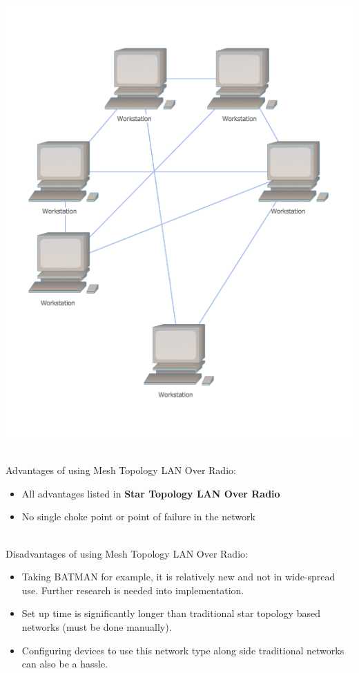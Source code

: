 \documentclass[onecolumn, draftclsnofoot,10pt, compsoc]{IEEEtran}
\begin{document}
		\begin{center}
			\includegraphics[scale=0.5]{Mesh-network-topology-diagram.png}
		\end{center}

		\noindent \\Advantages of using Mesh Topology LAN Over Radio:
		\begin{itemize}
			\item All advantages listed in \textbf{Star Topology LAN Over Radio}
			\item No single choke point or point of failure in the network
		\end{itemize}

		\noindent \\Disadvantages of using Mesh Topology LAN Over Radio:
		\begin{itemize}
			\item Taking BATMAN for example, it is relatively new and not in wide-spread use.  Further research is needed into implementation.
			\item Set up time is significantly longer than traditional star topology based networks (must be done manually).
			\item Configuring devices to use this network type along side traditional networks can also be a hassle.
		\end{itemize}
\end{document}
